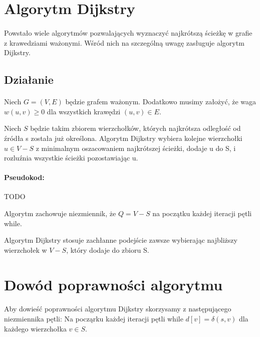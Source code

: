 \section{Algorytm Dijkstry}

\label{sec:dijkstra}

\paragraph{}Powstało wiele algorytmów pozwalających wyznaczyć najkrótszą ścieżkę w grafie z
krawedziami ważonymi. Wśród nich na szczególną uwagę zasługuje algorytm Dijkstry.

\subsection{Działanie}

\paragraph{}Niech $G = (V, E)$ będzie grafem ważonym. Dodatkowo musimy założyć, że waga $w(u,v) \ge 0$
dla wszystkich krawędzi $(u, v) \in E$.

Niech $S$ będzie takim zbiorem wierzchołków, których najkrótsza odległość od źródła
s została już określona. Algorytm Dijkstry wybiera kolejne wierzchołki $u \in V - S$
z minimalnym oszacowaniem najkrótszej ścieżki, dodaje u do S, i rozluźnia wszystkie ścieżki pozostawiając u.

\paragraph{Pseudokod:}
TODO

Algorytm zachowuje niezmiennik, że $Q = V - S$ na początku każdej iteracji pętli while.

Algorytm Dijkstry stosuje zachłanne podejście zawsze wybierając najbliższy wierzchołek
w $V - S$, który dodaje do zbioru S.

\section{Dowód poprawności algorytmu}

\paragraph{}Aby dowieść poprawności algorytmu Dijkstry skorzysamy z następującego niezmiennika pętli:
Na począrku każdej iteracji pętli while $d[v] = \delta(s,v)$ dla każdego wierzchołka $v \in S$.

